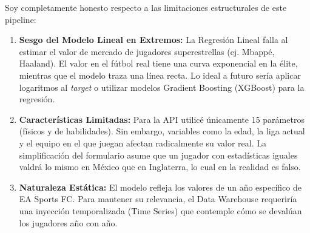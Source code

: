 \documentclass[12pt,letterpaper]{article}
\begin{document}
Soy completamente honesto respecto a las limitaciones estructurales de este pipeline:
\begin{enumerate}
    \item \textbf{Sesgo del Modelo Lineal en Extremos:} La Regresión Lineal falla al estimar el valor de mercado de jugadores superestrellas (ej. Mbappé, Haaland). El valor en el fútbol real tiene una curva exponencial en la élite, mientras que el modelo traza una línea recta. Lo ideal a futuro sería aplicar logaritmos al \textit{target} o utilizar modelos Gradient Boosting (XGBoost) para la regresión.
    \item \textbf{Características Limitadas:} Para la API utilicé únicamente 15 parámetros (físicos y de habilidades). Sin embargo, variables como la edad, la liga actual y el equipo en el que juegan afectan radicalmente su valor real. La simplificación del formulario asume que un jugador con estadísticas iguales valdrá lo mismo en México que en Inglaterra, lo cual en la realidad es falso.
    \item \textbf{Naturaleza Estática:} El modelo refleja los valores de un año específico de EA Sports FC. Para mantener su relevancia, el Data Warehouse requeriría una inyección temporalizada (Time Series) que contemple cómo se devalúan los jugadores año con año.
\end{enumerate}
\end{document}
